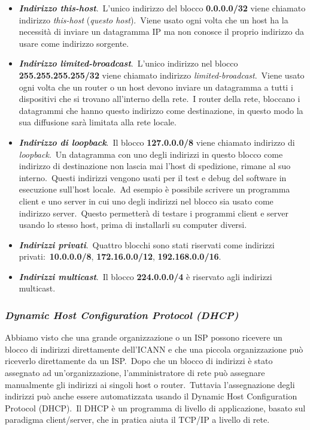 \begin{itemize}
    \item \textbf{\emph{Indirizzo this-host}}.\
          L'unico indirizzo del blocco \textbf{0.0.0.0/32} viene chiamato indirizzo \emph{this-host} (\emph{questo host}).\
          Viene usato ogni volta che un host ha la necessità di inviare un datagramma IP ma non conosce il proprio indirizzo da usare come indirizzo sorgente.
    \item \textbf{\emph{Indirizzo limited-broadcast}}.\
          L'unico indirizzo nel blocco\\ \textbf{255.255.255.255/32} viene chiamato indirizzo \emph{limited-broadcast}.\
          Viene usato ogni volta che un router o un host devono inviare un datagramma a tutti i dispositivi che si trovano all'interno della rete.\
          I router della rete, bloccano i datagrammi che hanno questo indirizzo come destinazione, in questo modo la sua diffusione sarà limitata alla rete locale.
    \item \textbf{\emph{Indirizzo di loopback}}.\
          Il blocco \textbf{127.0.0.0/8} viene chiamato indirizzo di \emph{loopback}.\
          Un datagramma con uno degli indirizzi in questo blocco come indirizzo di destinazione non lascia mai l'host di spedizione, rimane al suo interno.\
          Questi indirizzi vengono usati per il test e debug del software in esecuzione sull'host locale.\
          Ad esempio è possibile scrivere un programma client e uno server in cui uno degli indirizzi nel blocco sia usato come indirizzo server.\
          Questo permetterà di testare i programmi client e server usando lo stesso host, prima di installarli su computer diversi.
    \item \textbf{\emph{Indirizzi privati}}.\
          Quattro blocchi sono stati riservati come indirizzi privati:\ \textbf{10.0.0.0/8}, \textbf{172.16.0.0/12}, \textbf{192.168.0.0/16}.\

    \item \textbf{\emph{Indirizzi multicast}}.\
          Il blocco \textbf{224.0.0.0/4} è riservato agli indirizzi multicast.
\end{itemize}

\subsubsection{\emph{Dynamic Host Configuration Protocol (DHCP)}}

Abbiamo visto che una grande organizzazione o un ISP possono ricevere un blocco di indirizzi direttamente dell'ICANN e che una piccola organizzazione può riceverlo direttamente da un ISP.\
Dopo che un blocco di indirizzi è stato assegnato ad un'organizzazione, l'amministratore di rete può assegnare manualmente gli indirizzi ai singoli host o router.\
Tuttavia l'assegnazione degli indirizzi può anche essere automatizzata usando il Dynamic Host Configuration Protocol (DHCP).\
Il DHCP è un programma di livello di applicazione, basato sul paradigma client/server, che in pratica aiuta il TCP/IP a livello di rete.

